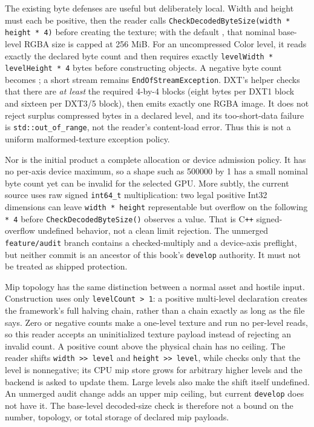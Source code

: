 The existing byte defenses are useful but deliberately local. Width and height must each be
positive, then the reader calls \texttt{CheckDecodedByteSize(width * height * 4)} before creating
the texture; with the default , that nominal base-level RGBA size is
capped at 256 MiB. For an uncompressed Color level, it reads exactly the declared byte count and
then requires exactly \texttt{levelWidth * levelHeight * 4} bytes before constructing
 objects. A negative byte count becomes ; a short
stream remains \texttt{EndOfStreamException}. DXT's helper checks that there are \emph{at least}
the required 4-by-4 blocks (eight bytes per DXT1 block and sixteen per DXT3/5 block), then emits
exactly one RGBA image. It does not reject surplus compressed bytes in a declared level, and its
too-short-data failure is \texttt{std::out\_of\_range}, not the reader's content-load error.
Thus this is not a uniform malformed-texture exception policy.

Nor is the initial product a complete allocation or device admission policy. It has no per-axis
device maximum, so a shape such as 500000 by 1 has a small nominal byte count yet can be invalid
for the selected GPU. More subtly, the current source uses raw signed \texttt{int64\_t}
multiplication: two legal positive Int32 dimensions can leave \texttt{width * height} representable
but overflow on the following \texttt{* 4} before \texttt{CheckDecodedByteSize()} observes a
value. That is C\texttt{++} signed-overflow undefined behavior, not a clean limit rejection.
The unmerged \texttt{feature/audit} branch contains a checked-multiply and a device-axis preflight,
but neither commit is an ancestor of this book's \texttt{develop} authority. It must not be
treated as shipped protection.

Mip topology has the same distinction between a normal asset and hostile input. Construction uses
only \texttt{levelCount > 1}: a positive multi-level declaration creates the framework's full
halving chain, rather than a chain exactly as long as the file says. Zero or negative counts make
a one-level texture and run no per-level reads, so this reader accepts an uninitialized texture
payload instead of rejecting an invalid count. A positive count above the physical chain has no
ceiling. The reader shifts \texttt{width >> level} and \texttt{height >> level}, while
 checks only that the level is nonnegative; its CPU mip store grows
for arbitrary higher levels and the backend is asked to update them. Large levels also make the
shift itself undefined. An unmerged audit change adds an upper mip ceiling, but current
\texttt{develop} does not have it. The base-level decoded-size check is therefore not a bound on
the number, topology, or total storage of declared mip payloads.

